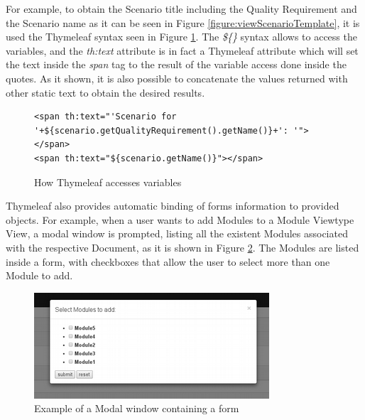 \documentclass{llncs}
\begin{document}
For example, to obtain the Scenario title including the Quality Requirement and the Scenario name as it can be seen in Figure \ref{figure:viewScenarioTemplate}, it is used the Thymeleaf syntax seen in Figure \ref{figure:viewsCallingMethods}. The \textit{\$\{\}} syntax allows to access the variables, and the \textit{th:text} attribute is in fact a Thymeleaf attribute which will set the text inside the \textit{span} tag to the result of the variable access done inside the quotes. As it shown, it is also possible to concatenate the values returned with other static text to obtain the desired results.
\begin{figure}
\lstset{style=customhtml}
\begin{lstlisting}
<span th:text="'Scenario for '+${scenario.getQualityRequirement().getName()}+': '">
</span> 
<span th:text="${scenario.getName()}"></span>
\end{lstlisting}
\caption{How Thymeleaf accesses variables}
\label{figure:viewsCallingMethods}
\end{figure}

Thymeleaf also provides automatic binding of forms information to provided objects. For example, when a user wants to add Modules to a Module Viewtype View, a modal window is prompted, listing all the existent Modules associated with the respective Document, as it is shown in Figure \ref{figure:viewsModalFormExample}. The Modules are listed inside a form, with checkboxes that allow the user to select more than one Module to add. 

\begin{figure}
\centering
\includegraphics{images/modalExample}
\caption{Example of a Modal window containing a form}
\label{figure:viewsModalFormExample}
\end{figure}
\end{document}
